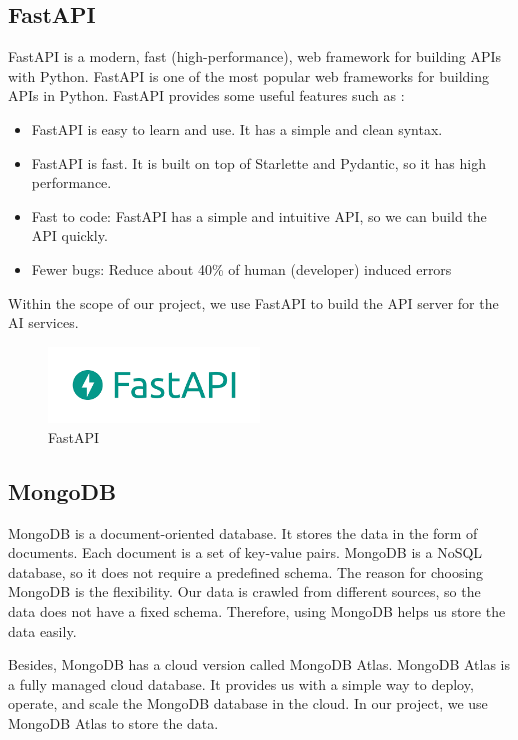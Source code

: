 \subsection{FastAPI}
FastAPI is a modern, fast (high-performance), web framework for building APIs with Python. FastAPI is one of the most popular web frameworks for building APIs in Python. FastAPI provides some useful features such as \cite{fastapi}:
\begin{itemize}
    \item FastAPI is easy to learn and use. It has a simple and clean syntax.
    \item FastAPI is fast. It is built on top of Starlette and Pydantic, so it has high performance.
    \item Fast to code: FastAPI has a simple and intuitive API, so we can build the API quickly.
    \item Fewer bugs: Reduce about 40\% of human (developer) induced errors
\end{itemize} 

\noindent Within the scope of our project, we use FastAPI to build the API server for the AI services. 

\begin{figure}[ht]
    \centering
    \includegraphics[width=0.5\textwidth]{../Images/8.Technology_Stack/fastapi_logo.png}
    \caption{FastAPI}
    \label{fig:fastapi}
\end{figure}

\subsection{MongoDB}
MongoDB is a document-oriented database. It stores the data in the form of documents. Each document is a set of key-value pairs. MongoDB is a NoSQL database, so it does not require a predefined schema. The reason for choosing MongoDB is the flexibility. Our data is crawled from different sources, so the data does not have a fixed schema. Therefore, using MongoDB helps us store the data easily.

Besides, MongoDB has a cloud version called MongoDB Atlas. MongoDB Atlas is a fully managed cloud database. It provides us with a simple way to deploy, operate, and scale the MongoDB database in the cloud. In our project, we use MongoDB Atlas to store the data.


